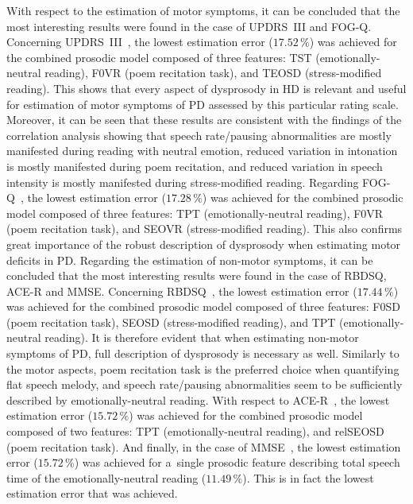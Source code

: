 With respect to the estimation of motor symptoms, it can be concluded that the most interesting results were found in the case of UPDRS~III and FOG-Q. Concerning UPDRS~III~\cite{Fahn1987}, the lowest estimation error ($17.52\,\%$) was achieved for the combined prosodic model composed of three features: TST (emotionally-neutral reading), F0VR (poem recitation task), and TEOSD (stress-modified reading). This shows that every aspect of dysprosody in HD is relevant and useful for estimation of motor symptoms of PD assessed by this particular rating scale. Moreover, it can be seen that these results are consistent with the findings of the correlation analysis showing that speech rate/pausing abnormalities are mostly manifested during reading with neutral emotion, reduced variation in intonation is mostly manifested during poem recitation, and reduced variation in speech intensity is mostly manifested during stress-modified reading. Regarding FOG-Q~\cite{Giladi2000}, the lowest estimation error ($17.28\,\%$) was achieved for the combined prosodic model composed of three features: TPT (emotionally-neutral reading), F0VR (poem recitation task), and SEOVR (stress-modified reading). This also confirms great importance of the robust description of dysprosody when estimating motor deficits in PD. Regarding the estimation of non-motor symptoms, it can be concluded that the most interesting results were found in the case of RBDSQ, ACE-R and MMSE. Concerning RBDSQ~\cite{Stiasny2007}, the lowest estimation error ($17.44\,\%$) was achieved for the combined prosodic model composed of three features: F0SD (poem recitation task), SEOSD (stress-modified reading), and TPT (emotionally-neutral reading). It is therefore evident that when estimating non-motor symptoms of PD, full description of dysprosody is necessary as well. Similarly to the motor aspects, poem recitation task is the preferred choice when quantifying flat speech melody, and speech rate/pausing abnormalities seem to be sufficiently described by emotionally-neutral reading. With respect to ACE-R~\cite{Larner2007}, the lowest estimation error ($15.72\,\%$) was achieved for the combined prosodic model composed of two features: TPT (emotionally-neutral reading), and relSEOSD (poem recitation task). And finally, in the case of MMSE~\cite{Folstein1975}, the lowest estimation error ($15.72\,\%$) was achieved for a~single prosodic feature describing total speech time of the emotionally-neutral reading ($11.49\,\%$). This is in fact the lowest estimation error that was achieved.

